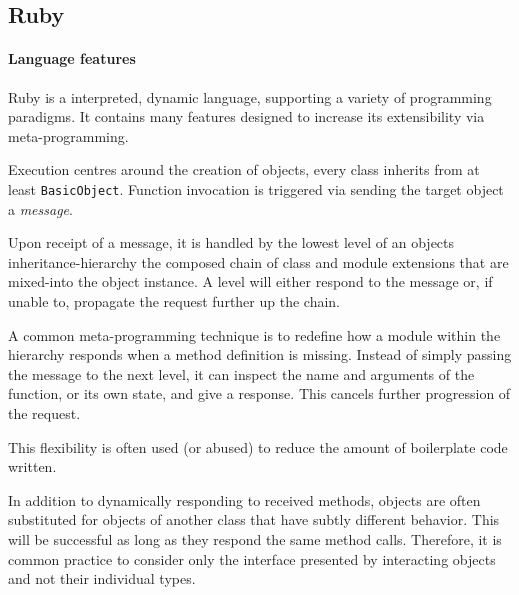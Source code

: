 \subsection{Ruby}
\paragraph*{Language features}
Ruby\cite{rubylang} is a interpreted, dynamic language, supporting a variety of programming paradigms. It contains many features designed to increase its extensibility via meta-programming.

Execution centres around the creation of objects, every class inherits from at least \verb|BasicObject|. Function invocation is triggered via sending the target object a \emph{message}.

Upon receipt of a message, it is handled by the lowest level of an objects inheritance-hierarchy \textemdash{} the composed chain of class and module extensions that are mixed-into the object instance. A level will either respond to the message or, if unable to, propagate the request further up the chain.

A common meta-programming technique is to redefine how a module within the hierarchy responds when a method definition is missing. Instead of simply passing the message to the next level, it can inspect the name and arguments of the function, or its own state, and give a response. This cancels further progression of the request.

\begin{comment}
\begin{lstlisting}[
  language=Ruby,
  label=lst:methmiss,
  caption=A toy example where an object responds to a missing method instead of propagating the message.
]
class HungryHippo
  def eat
    puts "Nom nom nom!"
  end

  def method_missing(meth, *args, &block)
    if /eat/.match meth.to_s
      puts "Eat? ok then."
      eat
    else
      super
    end
  end
end

hippo = HungryHippo.new
hippo.eat
hippo.dont_eat
# >> Nom nom nom!
# >> Eat? ok then.
# >> Nom nom nom!
\end{lstlisting}
\end{comment}

This flexibility is often used (or abused) to reduce the amount of boilerplate code written.

In addition to dynamically responding to received methods, objects are often substituted for objects of another class that have subtly different behavior. This will be successful as long as they respond the same method calls. Therefore, it is common practice to consider only the interface presented by interacting objects and not their individual types.

